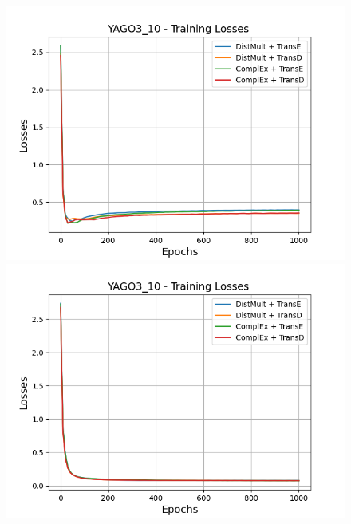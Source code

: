 \begin{figure}[H]
    \centering
    \begin{minipage}{.45\textwidth}
      \centering
      \includegraphics[width=0.9\linewidth]{figures/results/gan_train/not_pretrained/random/yago3_10/1k_epochs/random_yago3_10_losses.png}
    \end{minipage}%
    \begin{minipage}{.45\textwidth}
      \centering
      \includegraphics[width=0.9\linewidth]{figures/results/gan_train/not_pretrained/uncertainty/max_distribution/entropy/yago3_10/1k_epochs/uncertainty_yago3_10_losses.png}
    \end{minipage}
    \begin{minipage}{.45\textwidth}
      \centering

\end{minipage}
\end{figure}
